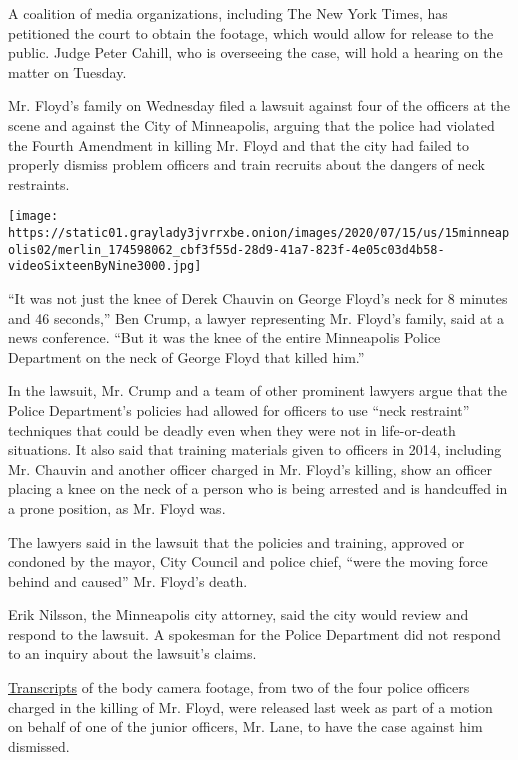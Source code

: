 A coalition of media organizations, including The New York Times, has
petitioned the court to obtain the footage, which would allow for
release to the public. Judge Peter Cahill, who is overseeing the case,
will hold a hearing on the matter on Tuesday.

Mr. Floyd's family on Wednesday filed a lawsuit against four of the
officers at the scene and against the City of Minneapolis, arguing that
the police had violated the Fourth Amendment in killing Mr. Floyd and
that the city had failed to properly dismiss problem officers and train
recruits about the dangers of neck restraints.

\texttt{[image: https://static01.graylady3jvrrxbe.onion/images/2020/07/15/us/15minneapolis02/merlin\_174598062\_cbf3f55d-28d9-41a7-823f-4e05c03d4b58-videoSixteenByNine3000.jpg]}

``It was not just the knee of Derek Chauvin on George Floyd's neck for 8
minutes and 46 seconds,'' Ben Crump, a lawyer representing Mr. Floyd's
family, said at a news conference. ``But it was the knee of the entire
Minneapolis Police Department on the neck of George Floyd that killed
him.''

In the lawsuit, Mr. Crump and a team of other prominent lawyers argue
that the Police Department's policies had allowed for officers to use
``neck restraint'' techniques that could be deadly even when they were
not in life-or-death situations. It also said that training materials
given to officers in 2014, including Mr. Chauvin and another officer
charged in Mr. Floyd's killing, show an officer placing a knee on the
neck of a person who is being arrested and is handcuffed in a prone
position, as Mr. Floyd was.

The lawyers said in the lawsuit that the policies and training, approved
or condoned by the mayor, City Council and police chief, ``were the
moving force behind and caused'' Mr. Floyd's death.

Erik Nilsson, the Minneapolis city attorney, said the city would review
and respond to the lawsuit. A spokesman for the Police Department did
not respond to an inquiry about the lawsuit's claims.

\href{https://www.nytimes3xbfgragh.onion/2020/07/08/us/george-floyd-body-camera-transcripts.html}{Transcripts}
of the body camera footage, from two of the four police officers charged
in the killing of Mr. Floyd, were released last week as part of a motion
on behalf of one of the junior officers, Mr. Lane, to have the case
against him dismissed.


